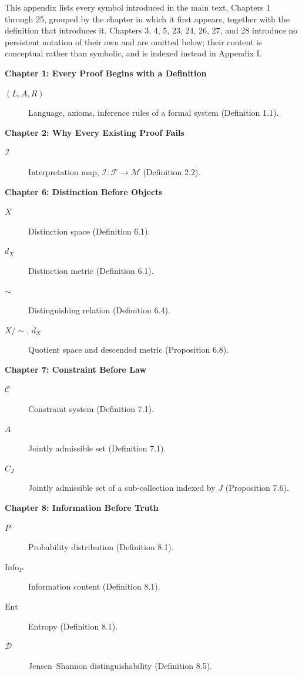 \documentclass[11pt]{book}
\begin{document}
This appendix lists every symbol introduced in the main text, Chapters 1 through 25, grouped by the chapter in which it first appears, together with the definition that introduces it. Chapters 3, 4, 5, 23, 24, 26, 27, and 28 introduce no persistent notation of their own and are omitted below; their content is conceptual rather than symbolic, and is indexed instead in Appendix I.

\medskip
\noindent\textbf{Chapter 1: Every Proof Begins with a Definition}
\begin{description}
\item[$(L,A,R)$] Language, axioms, inference rules of a formal system (Definition 1.1).
\end{description}

\noindent\textbf{Chapter 2: Why Every Existing Proof Fails}
\begin{description}
\item[$\mathcal I$] Interpretation map, $\mathcal I : \mathcal F \to \mathcal M$ (Definition 2.2).
\end{description}

\noindent\textbf{Chapter 6: Distinction Before Objects}
\begin{description}
\item[$X$] Distinction space (Definition 6.1).
\item[$d_X$] Distinction metric (Definition 6.1).
\item[$\sim$] Distinguishing relation (Definition 6.4).
\item[$X/\!\sim$, $\bar d_X$] Quotient space and descended metric (Proposition 6.8).
\end{description}

\noindent\textbf{Chapter 7: Constraint Before Law}
\begin{description}
\item[$\mathcal C$] Constraint system (Definition 7.1).
\item[$A$] Jointly admissible set (Definition 7.1).
\item[$C_J$] Jointly admissible set of a sub-collection indexed by $J$ (Proposition 7.6).
\end{description}

\noindent\textbf{Chapter 8: Information Before Truth}
\begin{description}
\item[$P$] Probability distribution (Definition 8.1).
\item[$\mathrm{Info}_P$] Information content (Definition 8.1).
\item[$\mathrm{Ent}$] Entropy (Definition 8.1).
\item[$\mathcal D$] Jensen--Shannon distinguishability (Definition 8.5).
\end{description}
\end{document}
